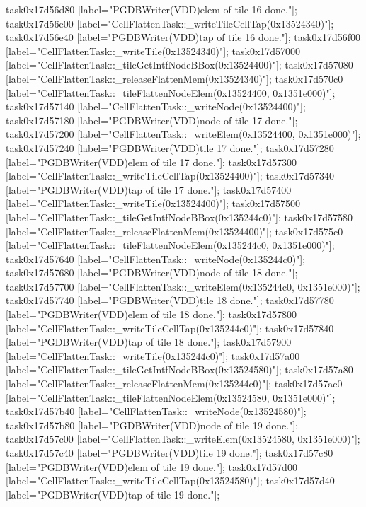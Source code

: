 {	task0x17d56d80 [label="PGDBWriter(VDD)\nCell elem of tile 16 done."];
	task0x17d56e00 [label="CellFlattenTask::_writeTileCellTap(0x13524340)"];
	task0x17d56e40 [label="PGDBWriter(VDD)\nCell tap of tile 16 done."];
	task0x17d56f00 [label="CellFlattenTask::_writeTile(0x13524340)"];
	task0x17d57000 [label="CellFlattenTask::_tileGetIntfNodeBBox(0x13524400)"];
	task0x17d57080 [label="CellFlattenTask::_releaseFlattenMem(0x13524340)"];
	task0x17d570c0 [label="CellFlattenTask::_tileFlattenNodeElem(0x13524400, 0x1351e000)"];
	task0x17d57140 [label="CellFlattenTask::_writeNode(0x13524400)"];
	task0x17d57180 [label="PGDBWriter(VDD)\nCell node of tile 17 done."];
	task0x17d57200 [label="CellFlattenTask::_writeElem(0x13524400, 0x1351e000)"];
	task0x17d57240 [label="PGDBWriter(VDD)\nCell tile 17 done."];
	task0x17d57280 [label="PGDBWriter(VDD)\nCell elem of tile 17 done."];
	task0x17d57300 [label="CellFlattenTask::_writeTileCellTap(0x13524400)"];
	task0x17d57340 [label="PGDBWriter(VDD)\nCell tap of tile 17 done."];
	task0x17d57400 [label="CellFlattenTask::_writeTile(0x13524400)"];
	task0x17d57500 [label="CellFlattenTask::_tileGetIntfNodeBBox(0x135244c0)"];
	task0x17d57580 [label="CellFlattenTask::_releaseFlattenMem(0x13524400)"];
	task0x17d575c0 [label="CellFlattenTask::_tileFlattenNodeElem(0x135244c0, 0x1351e000)"];
	task0x17d57640 [label="CellFlattenTask::_writeNode(0x135244c0)"];
	task0x17d57680 [label="PGDBWriter(VDD)\nCell node of tile 18 done."];
	task0x17d57700 [label="CellFlattenTask::_writeElem(0x135244c0, 0x1351e000)"];
	task0x17d57740 [label="PGDBWriter(VDD)\nCell tile 18 done."];
	task0x17d57780 [label="PGDBWriter(VDD)\nCell elem of tile 18 done."];
	task0x17d57800 [label="CellFlattenTask::_writeTileCellTap(0x135244c0)"];
	task0x17d57840 [label="PGDBWriter(VDD)\nCell tap of tile 18 done."];
	task0x17d57900 [label="CellFlattenTask::_writeTile(0x135244c0)"];
	task0x17d57a00 [label="CellFlattenTask::_tileGetIntfNodeBBox(0x13524580)"];
	task0x17d57a80 [label="CellFlattenTask::_releaseFlattenMem(0x135244c0)"];
	task0x17d57ac0 [label="CellFlattenTask::_tileFlattenNodeElem(0x13524580, 0x1351e000)"];
	task0x17d57b40 [label="CellFlattenTask::_writeNode(0x13524580)"];
	task0x17d57b80 [label="PGDBWriter(VDD)\nCell node of tile 19 done."];
	task0x17d57c00 [label="CellFlattenTask::_writeElem(0x13524580, 0x1351e000)"];
	task0x17d57c40 [label="PGDBWriter(VDD)\nCell tile 19 done."];
	task0x17d57c80 [label="PGDBWriter(VDD)\nCell elem of tile 19 done."];
	task0x17d57d00 [label="CellFlattenTask::_writeTileCellTap(0x13524580)"];
	task0x17d57d40 [label="PGDBWriter(VDD)\nCell tap of tile 19 done."];
}
